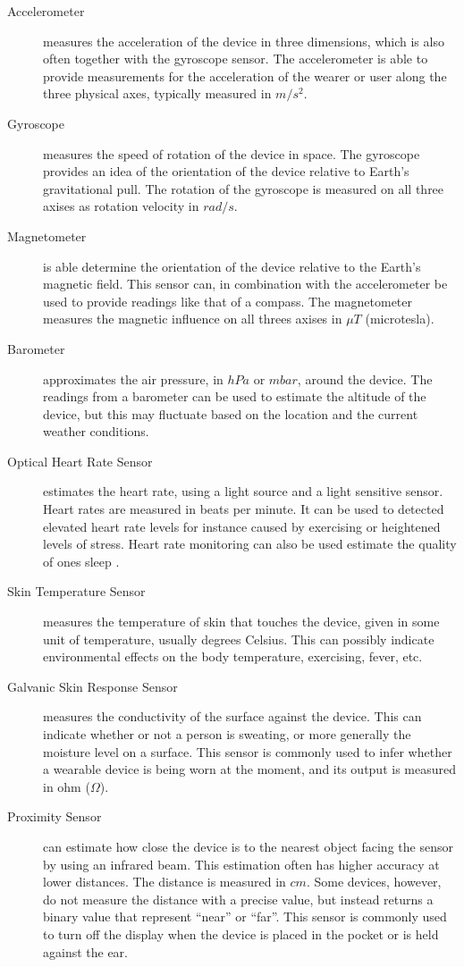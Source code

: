 \begin{description}
	\item[Accelerometer] measures the acceleration of the device in three dimensions, which is also often together with the gyroscope sensor. The accelerometer is able to provide measurements for the acceleration of the wearer or user along the three physical axes, typically measured in $m/s^2$.
	\item[Gyroscope] measures the speed of rotation of the device in space. The gyroscope provides an idea of the orientation of the device relative to Earth's gravitational pull. The rotation of the gyroscope is measured on all three axises as rotation velocity in $rad/s$.
	\item[Magnetometer] is able determine the orientation of the device relative to the Earth's magnetic field. This sensor can, in combination with the accelerometer be used to provide readings like that of a compass. The magnetometer measures the magnetic influence on all threes axises in $\mu T$ (microtesla).
	\item[Barometer] approximates the air pressure, in $hPa$ or $mbar$, around the device. The readings from a barometer can be used to estimate the altitude of the device, but this may fluctuate based on the location and the current weather conditions.
    \item[Optical Heart Rate Sensor] estimates the heart rate, using a light source and a light sensitive sensor. Heart rates are measured in beats per minute. It can be used to detected elevated heart rate levels for instance caused by exercising or heightened levels of stress. Heart rate monitoring can also be used estimate the quality of ones sleep \parencite{guardian_fitness_tracker_rem_sleep}. 
    \item[Skin Temperature Sensor] measures the temperature of skin that touches the device, given in some unit of temperature, usually degrees Celsius. This can possibly indicate environmental effects on the body temperature, exercising, fever, etc.
    \item[Galvanic Skin Response Sensor] measures the conductivity of the surface against the device. This can indicate whether or not a person is sweating, or more generally the moisture level on a surface. This sensor is commonly used to infer whether a wearable device is being worn at the moment, and its output is measured in ohm ($\Omega$).
    \item[Proximity Sensor] can estimate how close the device is to the nearest object facing the sensor by using an infrared beam. This estimation often has higher accuracy at lower distances. The distance is measured in $cm$. Some devices, however, do not measure the distance with a precise value, but instead returns a binary value that represent ``near'' or ``far''. This sensor is commonly used to turn off the display when the device is placed in the pocket or is held against the ear.

\end{description}
